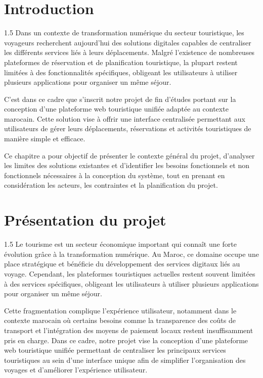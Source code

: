 \documentclass[a4paper,12pt]{report}
\begin{document}
\newpage
\section{Introduction}
\vspace{0.5cm}
\begin{spacing}{1.5}
\justifying
Dans un contexte de transformation numérique du secteur touristique, les voyageurs recherchent aujourd'hui des solutions digitales capables de centraliser les différents services liés à leurs déplacements. Malgré l'existence de nombreuses plateformes de réservation et de planification touristique, la plupart restent limitées à des fonctionnalités spécifiques, obligeant les utilisateurs à utiliser plusieurs applications pour organiser un même séjour.

C'est dans ce cadre que s'inscrit notre projet de fin d'études portant sur la conception d'une plateforme web touristique unifiée adaptée au contexte marocain. Cette solution vise à offrir une interface centralisée permettant aux utilisateurs de gérer leurs déplacements, réservations et activités touristiques de manière simple et efficace.

Ce chapitre a pour objectif de présenter le contexte général du projet, d'analyser les limites des solutions existantes et d'identifier les besoins fonctionnels et non fonctionnels nécessaires à la conception du système, tout en prenant en considération les acteurs, les contraintes et la planification du projet.
\end{spacing}

\section{Présentation du projet}
\vspace{0.5cm}
\begin{spacing}{1.5}
\justifying
Le tourisme est un secteur économique important qui connaît une forte évolution grâce à la transformation numérique. Au Maroc, ce domaine occupe une place stratégique et bénéficie du développement des services digitaux liés au voyage. Cependant, les plateformes touristiques actuelles restent souvent limitées à des services spécifiques, obligeant les utilisateurs à utiliser plusieurs applications pour organiser un même séjour.

Cette fragmentation complique l'expérience utilisateur, notamment dans le contexte marocain où certains besoins comme la transparence des coûts de transport et l'intégration des moyens de paiement locaux restent insuffisamment pris en charge. Dans ce cadre, notre projet vise la conception d'une plateforme web touristique unifiée permettant de centraliser les principaux services touristiques au sein d'une interface unique afin de simplifier l'organisation des voyages et d'améliorer l'expérience utilisateur.

\end{spacing}
\end{document}
